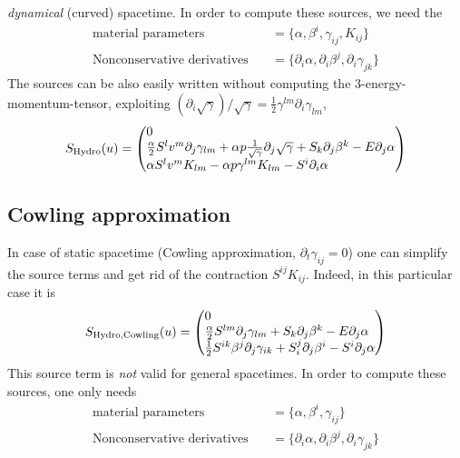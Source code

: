 \documentclass[a4paper]{article}
\newcommand{\desc}[1]{\text{#1}\quad}
\newcommand{\hydro}{\text{Hydro}}
\newenvironment{pvector}{\begin{pmatrix*}[l]}{\end{pmatrix*}}
\begin{document}
\emph{dynamical} (curved) spacetime. In order to compute these sources,
we need the
\begin{align}
\desc{material parameters}  &= \{ \alpha, \beta^i, \gamma_{ij}, K_{ij} \}
\\
\desc{Nonconservative derivatives} &= \{ \partial_i \alpha,
\partial_i \beta^j, \partial_i \gamma_{jk} \}
\end{align}
The sources can be also easily written without computing the 3-energy-momentum-tensor,
exploiting
$\left(\partial_i \sqrt\gamma\right) / \sqrt\gamma = \frac 12 \gamma^{lm} \partial_i \gamma_{lm}$,
\begin{equation}
S_\hydro(u) =
\begin{pvector}
0
\\
\frac \alpha2 S^l v^m \partial_j \gamma_{lm} + \alpha p \frac 1{\sqrt{\gamma}} \partial_j \sqrt{\gamma} + S_k \partial_j \beta^k - E \partial_j \alpha
\\
\alpha S^l v^m K_{lm} - \alpha p \gamma^{lm} K_{lm} - S^i \partial_i \alpha
\end{pvector}
\end{equation}

\subsection{Cowling approximation}
In case of static spacetime (Cowling approximation,
$\partial_t \gamma_{ij} = 0$) one can simplify the source terms and
get rid of the contraction $S^{ij}K_{ij}$. Indeed, in this particular
case it is
\begin{equation}
S_{\hydro\text{,Cowling}}(u) =
\begin{pvector}
0
\\
\frac \alpha2 S^{lm} \partial_j \gamma_{lm} + S_k \partial_j \beta^k - E \partial_j \alpha
\\
\frac 12 S^{ik} \beta^j \partial_j \gamma_{ik} + S^j_i \partial_j \beta^i - S^i \partial_j \alpha
\end{pvector}
\end{equation}
This source term is \emph{not} valid for general spacetimes. In order to
compute these sources, one only needs
\begin{align}
\desc{material parameters}  &= \{ \alpha, \beta^i, \gamma_{ij} \}
\\
\desc{Nonconservative derivatives} &= \{ \partial_i \alpha,
\partial_i \beta^j, \partial_i \gamma_{jk} \}
\end{align}
\end{document}

